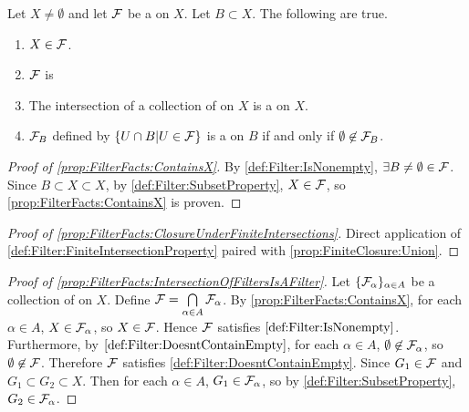 \begin{prop}
\label{prop:FilterFacts}
    Let $X \neq \emptyset$ and let $\mathcal{F}$ be a 
    \Filter on $X$. 
    Let $B \subset X$. 
    The following are true. 
    \begin{enumerate}[label=(\roman*), ref={\ref{prop:FilterFacts}~\roman*}]
        \item \label{prop:FilterFacts:ContainsX} $X \in \mathcal{F}$. 
        \item \label{prop:FilterFacts:ClosureUnderFiniteIntersections} $\mathcal{F}$ is \ClosedUnderFiniteIntersections
        \item \label{prop:FilterFacts:IntersectionOfFiltersIsAFilter} The intersection of a collection of \Filters on $X$ is a \Filter on $X$. 
        \item \label{prop:FilterFacts:InducedFilterExistence}
        $\mathcal{F}_B$ defined by $\{U \cap B | U \in \mathcal{F}\}$ is a \Filter on $B$ 
        if and only if $\emptyset \not \in \mathcal{F}_B$. 
    \end{enumerate}
    \begin{proof}[Proof of \ref{prop:FilterFacts:ContainsX}]
        By \ref{def:Filter:IsNonempty}, 
        $\exists B \neq \emptyset \in \mathcal{F}$. 
        Since $B \subset X \subset X$, by 
        \ref{def:Filter:SubsetProperty}, 
        $X \in \mathcal{F}$, so \ref{prop:FilterFacts:ContainsX} is proven. 
    \end{proof}
    \begin{proof}[Proof of \ref{prop:FilterFacts:ClosureUnderFiniteIntersections}]
        Direct application of \ref{def:Filter:FiniteIntersectionProperty} paired with 
        \ref{prop:FiniteClosure:Union}.
    \end{proof}
    \begin{proof}[Proof of \ref{prop:FilterFacts:IntersectionOfFiltersIsAFilter}]
        Let $\{\mathcal{F}_\alpha\}_{\alpha \in A}$ be a collection of \Filters on $X$. 
        Define $\mathcal{F}=\bigcap\limits_{\alpha \in A} \mathcal{F}_\alpha$. 
        By \ref{prop:FilterFacts:ContainsX}, for each $\alpha \in A$, 
        $X \in \mathcal{F}_\alpha$, so $X \in \mathcal{F}$.
        Hence $\mathcal{F}$ satisfies $\ref{def:Filter:IsNonempty}$.
        Furthermore, by $\ref{def:Filter:DoesntContainEmpty}$, for each 
        $\alpha \in A$, $\emptyset \not \in \mathcal{F}_\alpha$, so 
        $\emptyset \not \in \mathcal{F}$. Therefore $\mathcal{F}$ satisfies \ref{def:Filter:DoesntContainEmpty}.
        Since $G_1 \in \mathcal{F}$ and $G_1 \subset G_2 \subset X$. 
        Then for each $\alpha \in A$, $G_1 \in \mathcal{F}_\alpha$, so by 
        \ref{def:Filter:SubsetProperty}, $G_2 \in \mathcal{F}_\alpha$.

\end{proof}
\end{prop}
